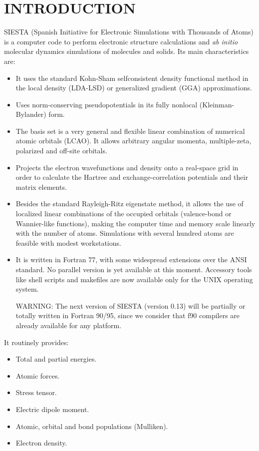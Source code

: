 
\tableofcontents

\newpage



\section{INTRODUCTION}

SIESTA (Spanish Initiative for Electronic Simulations with
Thousands of Atoms) is a computer code to perform electronic
structure calculations and {\it ab initio} molecular dynamics
simulations of molecules and solids.
Its main characteristics are:
\begin{itemize}
\item
It uses the standard Kohn-Sham selfconsistent density functional
method in the local density (LDA-LSD) or generalized gradient (GGA)
approximations.
\item
Uses norm-conserving pseudopotentials in its fully nonlocal
(Kleinman-Bylander) form.
\item
The basis set is a very general and flexible linear combination of 
numerical atomic orbitals (LCAO). It allows arbitrary angular
momenta, multiple-zeta, polarized and off-site orbitals.
\item
Projects the electron wavefunctions and density onto a real-space
grid in order to calculate the Hartree and exchange-correlation
potentials and their matrix elements.
\item
Besides the standard Rayleigh-Ritz eigenstate method, it allows
the use of localized linear combinations of the occupied orbitals
(valence-bond or Wannier-like functions), making the computer
time and memory scale linearly with the number of atoms.
Simulations with several hundred atoms are feasible with
modest workstations.
\item
It is written in Fortran 77, with some widespread extensions over
the ANSI standard. No parallel version is yet available at this
moment. Accessory tools like shell scripts and makefiles are now
available only for the UNIX operating system.

WARNING: The next version of SIESTA (version 0.13) will be partially
or totally written in Fortran 90/95, since we consider that
f90 compilers are already available for any platform.
\end{itemize}

It routinely provides:
\begin{itemize}
\item Total and partial energies.
\item Atomic forces.
\item Stress tensor.
\item Electric dipole moment.
\item Atomic, orbital and bond populations (Mulliken).
\item Electron density.
\end{itemize}

